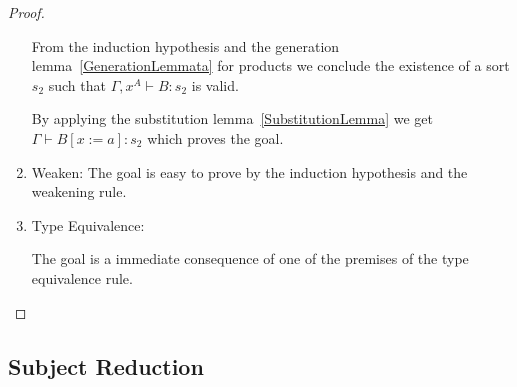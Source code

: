 \begin{theorem}
\begin{proof}
\begin{enumerate}
            From the induction hypothesis and the generation
                lemma~\ref{GenerationLemmata} for products we conclude the
                existence of a sort $s_2$ such that $\Gamma,x^A\vdash B: s_2$ is
                valid.

                By applying the substitution lemma~\ref{SubstitutionLemma} we
                get $\Gamma \vdash B[x:=a] : s_2$ which proves the goal.


        \item Weaken:
            The goal is easy to prove by the induction hypothesis and the
                weakening rule.

        \item Type Equivalence:

            The goal is a immediate consequence of one of the premises of the
                type equivalence rule.
        \end{enumerate}
    \end{proof}
\end{theorem}








\subsection{Subject Reduction}


